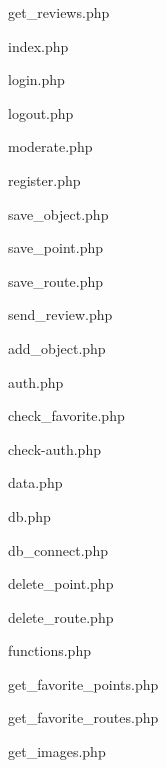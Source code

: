 get\_reviews.php


index.php


login.php


logout.php


moderate.php


register.php


save\_object.php


save\_point.php


save\_route.php


send\_review.php


add\_object.php


auth.php


check\_favorite.php


check-auth.php


data.php


db.php


db\_connect.php


delete\_point.php


delete\_route.php


functions.php


get\_favorite\_points.php


get\_favorite\_routes.php


get\_images.php


